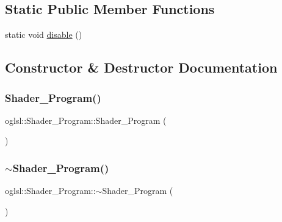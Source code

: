 \subsection*{Static Public Member Functions}
\begin{DoxyCompactItemize}
\item 
static void \mbox{\hyperlink{classoglsl_1_1_shader___program_a5513ced5c47dd2f020599ae4475bf907}{disable}} ()
\end{DoxyCompactItemize}


\subsection{Constructor \& Destructor Documentation}
\mbox{\label{classoglsl_1_1_shader___program_ae5615f167ca4f6991ee4d7e75625e8e1}} 
\subsubsection{\texorpdfstring{Shader\+\_\+\+Program()}{Shader\_Program()}}
{\footnotesize\ttfamily oglsl\+::\+Shader\+\_\+\+Program\+::\+Shader\+\_\+\+Program (\begin{DoxyParamCaption}{ }\end{DoxyParamCaption})\hspace{0.3cm}{\ttfamily [inline]}}

\mbox{\label{classoglsl_1_1_shader___program_a632041a7db2cd19b7be88f4223085cdd}} 
\subsubsection{\texorpdfstring{$\sim$\+Shader\+\_\+\+Program()}{~Shader\_Program()}}
{\footnotesize\ttfamily oglsl\+::\+Shader\+\_\+\+Program\+::$\sim$\+Shader\+\_\+\+Program (\begin{DoxyParamCaption}{ }\end{DoxyParamCaption})\hspace{0.3cm}{\ttfamily [inline]}}



